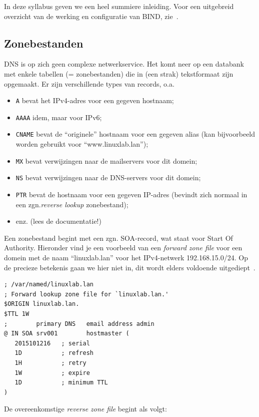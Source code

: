 In deze syllabus geven we een heel summiere inleiding. Voor een uitgebreid overzicht van de werking en configuratie van BIND, zie~\textcite{Aitchison2015}.

\subsection{Zonebestanden}
\label{ssec:zonebestanden}

DNS is op zich geen complexe netwerkservice. Het komt neer op een databank met enkele tabellen (= zonebestanden) die in (een strak) tekstformaat zijn opgemaakt. Er zijn verschillende types van records, o.a.

\begin{itemize}
\item \texttt{A} bevat het IPv4-adres voor een gegeven hostnaam;
\item \texttt{AAAA} idem, maar voor IPv6;
\item \texttt{CNAME} bevat de ``originele'' hostnaam voor een gegeven alias (kan bijvoorbeeld worden gebruikt voor ``www.linuxlab.lan'');
\item \texttt{MX} bevat verwijzingen naar de mailservers voor dit domein;
\item \texttt{NS} bevat verwijzingen naar de DNS-servers voor dit domein;
\item \texttt{PTR} bevat de hostnaam voor een gegeven IP-adres (bevindt zich normaal in een zgn.\emph{reverse lookup} zonebestand);
\item enz. (lees de documentatie!)
\end{itemize}

Een zonebestand begint met een zgn. SOA-record, wat staat voor Start Of Authority. Hieronder vind je een voorbeeld van een \emph{forward zone file} voor een domein met de naam ``linuxlab.lan'' voor het IPv4-netwerk 192.168.15.0/24. Op de precieze betekenis gaan we hier niet in, dit wordt elders voldoende uitgediept~\autocite{Aitchison2015}.

\begin{verbatim}
; /var/named/linuxlab.lan
; Forward lookup zone file for `linuxlab.lan.'
$ORIGIN linuxlab.lan.
$TTL 1W
;        primary DNS   email address admin
@ IN SOA srv001        hostmaster (
   2015101216   ; serial
   1D           ; refresh
   1H           ; retry
   1W           ; expire
   1D           ; minimum TTL
)
\end{verbatim}

De overeenkomstige \emph{reverse zone file} begint als volgt:

